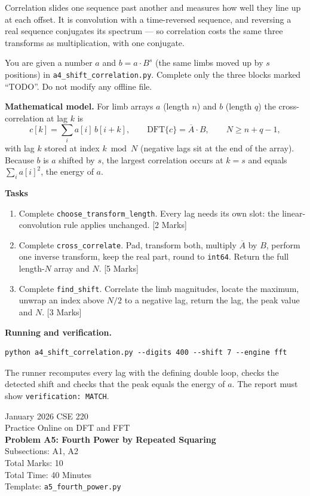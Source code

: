 \documentclass[11pt]{article}
\newcommand{\file}[1]{\texttt{#1}}
\newcommand{\code}[1]{\texttt{#1}}
\newcommand{\problemheader}[3]{%
  \begin{center}
    {\large January 2026 CSE 220}\\
    {\large Practice Online on DFT and FFT}\\[2pt]
    {\Large\bfseries #1}\\[2pt]
    Subsections: #2\\
    Total Marks: 10\\
    Total Time: 40 Minutes\\[2pt]
    {\small Template: \file{#3}}
  \end{center}
  \vspace{4pt}
}
\begin{document}
Correlation slides one sequence past another and measures how well they line
up at each offset. It is convolution with a time-reversed sequence, and
reversing a real sequence conjugates its spectrum --- so correlation costs the
same three transforms as multiplication, with one conjugate.

You are given a number $a$ and $b = a \cdot B^{s}$ (the same limbs moved up by
$s$ positions) in \file{a4\_shift\_correlation.py}. Complete only the three
blocks marked ``TODO''. Do not modify any offline file.

\textbf{Mathematical model.} For limb arrays $a$ (length $n$) and $b$ (length
$q$) the cross-correlation at lag $k$ is
\[
  c[k] = \sum_i a[i]\, b[i+k], \qquad
  \mathrm{DFT}\{c\} = \overline{A} \cdot B, \qquad N \ge n + q - 1,
\]
with lag $k$ stored at index $k \bmod N$ (negative lags sit at the end of the
array). Because $b$ is $a$ shifted by $s$, the largest correlation occurs at
$k = s$ and equals $\sum_i a[i]^2$, the energy of $a$.

\textbf{Tasks}
\begin{enumerate}[nosep]
  \item Complete \code{choose\_transform\_length}. Every lag needs its own
        slot: the linear-convolution rule applies unchanged.
        \hfill [2 Marks]
  \item Complete \code{cross\_correlate}. Pad, transform both, multiply
        $\overline{A}$ by $B$, perform one inverse transform, keep the real
        part, round to \code{int64}. Return the full length-$N$ array and $N$.
        \hfill [5 Marks]
  \item Complete \code{find\_shift}. Correlate the limb magnitudes, locate the
        maximum, unwrap an index above $N/2$ to a negative lag, return the lag,
        the peak value and $N$.
        \hfill [3 Marks]
\end{enumerate}

\textbf{Running and verification.}
\begin{lstlisting}
python a4_shift_correlation.py --digits 400 --shift 7 --engine fft
\end{lstlisting}
The runner recomputes every lag with the defining double loop, checks the
detected shift and checks that the peak equals the energy of $a$. The report
must show \code{verification: MATCH}.

\newpage
\problemheader{Problem A5: Fourth Power by Repeated Squaring}{A1, A2}{a5\_fourth\_power.py}
\end{document}
